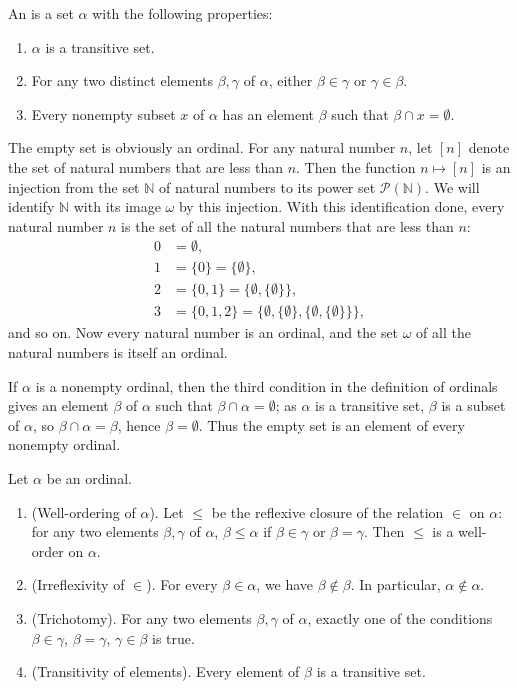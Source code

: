 \documentclass{article}
\begin{document}
An  is a set \(\alpha\) with the following
properties:
\begin{enumerate}
\item \(\alpha\) is a transitive set.
\item For any two distinct elements \(\beta, \gamma\) of \(\alpha\),
  either \(\beta \in \gamma\) or \(\gamma \in \beta\).
\item Every nonempty subset \(x\) of \(\alpha\) has an element
  \(\beta\) such that \(\beta \cap x = \emptyset\).
\end{enumerate}

The empty set is obviously an ordinal.  For any natural number \(n\),
let \([n]\) denote the set of natural numbers that are less than
\(n\).  Then the function \(n \mapsto [n]\) is an injection from the
set \(\mathbb{N}\) of natural numbers to its power set
\(\mathcal{P}(\mathbb{N})\).  We will identify \(\mathbb{N}\) with its
image \(\omega\) by this injection.  With this identification done,
every natural number \(n\) is the set of all the natural numbers that
are less than \(n\):
\begin{align*}
  0 & = \emptyset, \\
  1 &= \{ 0 \} = \{ \emptyset \}, \\
  2 &= \{ 0, 1 \} = \{ \emptyset, \{ \emptyset \} \}, \\
  3 &= \{ 0, 1, 2 \} =
      \{
      \emptyset, \{ \emptyset \}, \{ \emptyset, \{ \emptyset \} \}
      \},
\end{align*}
and so on.  Now every natural number is an ordinal, and the set
\(\omega\) of all the natural numbers is itself an ordinal.

If \(\alpha\) is a nonempty ordinal, then the third condition in the
definition of ordinals gives an element \(\beta\) of \(\alpha\) such
that \(\beta \cap \alpha = \emptyset\); as \(\alpha\) is a transitive
set, \(\beta\) is a subset of \(\alpha\), so
\(\beta \cap \alpha = \beta\), hence \(\beta = \emptyset\).  Thus the
empty set is an element of every nonempty ordinal.

\begin{theorem}
  \label{thm:7cc2cckf}
  Let \(\alpha\) be an ordinal.
  \begin{enumerate}
  \item (Well-ordering of \(\alpha\)).  Let \(\leq\) be the reflexive
    closure of the relation \(\in\) on \(\alpha\): for any two
    elements \(\beta, \gamma\) of \(\alpha\), \(\beta \leq \alpha\) if
    \(\beta \in \gamma\) or \(\beta = \gamma\).  Then \(\leq\) is a
    well-order on \(\alpha\).
  \item (Irreflexivity of \(\in\)).  For every \(\beta \in \alpha\),
    we have \(\beta \notin \beta\).  In particular,
    \(\alpha \notin \alpha\).
  \item (Trichotomy).  For any two elements \(\beta, \gamma\) of
    \(\alpha\), exactly one of the conditions \(\beta \in \gamma\),
    \(\beta = \gamma\), \(\gamma \in \beta\) is true.
  \item (Transitivity of elements).  Every element of \(\beta\) is a
    transitive set.
  \end{enumerate}
\end{theorem}
\end{document}
